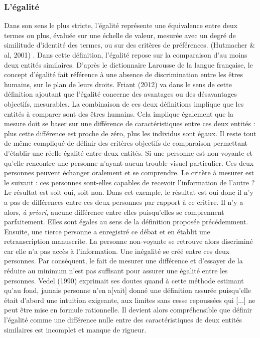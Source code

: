\subsubsection{L'égalité}
Dans son sens le plus stricte, l'égalité représente une équivalence entre deux termes ou plus, évaluée sur une échelle de valeur, mesurée avec un degré de similitude d'identité des termes, ou sur des critères de préférences. (Hutmacher \& al, 2001) \cite{Hutmacher2001}. Dans cette définition, l'égalité repose sur la comparaison d'au moins deux entités similaires.
D'après le dictionnaire Larousse \cite{DictionnaireLarousse} de la langue française, le concept d'égalité fait référence à une absence de discrimination entre les êtres humains, sur le plan de leurs droits. Friant (2012) \cite{Friant2012} va dans le sens de cette définition ajoutant que l'égalité concerne des avantages ou des désavantages objectifs, mesurables. 
La combinaison de ces deux définitions implique que les entités à comparer sont des êtres humains. Cela implique également que la mesure doit se baser sur une différence de caractéristiques entre ces deux entités : plus cette différence est proche de zéro, plus les individus sont égaux. Il reste tout de même compliqué de définir des critères objectifs de comparaison permettant d'établir une réelle égalité entre deux entités. Si une personne est non-voyante et qu'elle rencontre une personne n'ayant aucun trouble visuel particulier. Ces deux personnes peuvent échanger oralement et se comprendre. Le critère à mesurer est le suivant : ces personnes sont-elles capables de recevoir l'information de l'autre ? Le résultat est soit oui, soit non. Dans cet exemple, le résultat est oui donc il n'y a pas de différences entre ces deux personnes par rapport à ce critère. Il n'y a alors, \textit{à priori}, aucune différence entre elles puisqu'elles se comprennent parfaitement. Elles sont égales au sens de la définition proposée précédemment. Ensuite, une tierce personne a enregistré ce débat et en établit une retranscription manuscrite. La personne non-voyante se retrouve alors discriminé car elle n'a pas accès à l'information. Une inégalité se créé entre ces deux personnes. Par conséquent, le fait de mesurer une différence et d'essayer de la réduire au minimum n'est pas suffisant pour assurer une égalité entre les personnes. Vedel (1990) \cite{Vedel1990} exprimait ses doutes quand à cette méthode estimant qu'\og au fond, jamais personne n'en a[vait] donné une définition assurée \fg{} puisqu'elle était \og d'abord une intuition exigeante, aux limites sans cesse repoussées qui [...] ne peut être mise en formule rationnelle\fg{}. Il devient alors compréhensible que définir l'égalité comme une différence nulle entre des caractéristiques de deux entités similaires est incomplet et manque de rigueur. 

